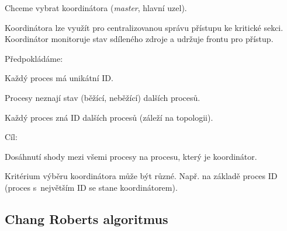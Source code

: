 \begin{compactitem}
    \item Chceme vybrat koordinátora (\textit{master}, hlavní uzel). \begin{compactitem}
        \item Koordinátora lze využít pro centralizovanou správu přístupu ke kritické sekci. Koordinátor monitoruje stav sdíleného zdroje a udržuje frontu pro přístup.
    \end{compactitem}

    \item Předpokládáme:
    \begin{compactitem}
        \item Každý proces má unikátní ID.
        \item Procesy neznají stav (běžící, neběžící) dalších procesů.
        \item Každý proces zná ID dalších procesů (záleží na topologii).
    \end{compactitem}
    \item Cíl:
    \begin{compactitem}
        \item Dosáhnutí shody mezi všemi procesy na procesu, který je koordinátor.
        \item Kritérium výběru koordinátora může být různé. Např. na základě proces ID (proces s~největším ID se stane koordinátorem).
    \end{compactitem}
\end{compactitem}

\subsection{Chang Roberts algoritmus}

